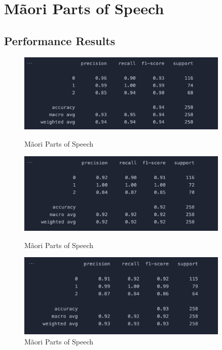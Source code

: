 \section{M\~aori Parts of Speech}

\subsection{Performance Results}

\begin{figure}[H]
  \centering
  \begin{minipage}[b]{0.8\textwidth}
    \centering
    \includegraphics[width=0.9\textwidth]{figures/1-f1-1.png}
    \caption{M\~aori Parts of Speech}
    \label{fig:maori-pos-1}
  \end{minipage}
  \hfill
  \begin{minipage}[b]{0.8\textwidth}
    \centering
    \includegraphics[width=0.9\textwidth]{figures/1-f1-2.png}
    \caption{M\~aori Parts of Speech}
    \label{fig:maori-pos-2}
  \end{minipage}
  \begin{minipage}[b]{0.8\textwidth}
    \centering
    \includegraphics[width=0.9\textwidth]{figures/1-f1-3.png}
    \caption{M\~aori Parts of Speech}
    \label{fig:maori-pos-3}
  \end{minipage}
\end{figure}


